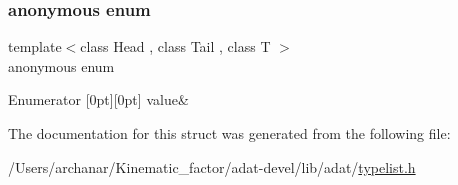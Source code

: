 \subsubsection{\texorpdfstring{anonymous enum}{anonymous enum}}
{\footnotesize\ttfamily template$<$class Head , class Tail , class T $>$ \\
anonymous enum}

\begin{DoxyEnumFields}{Enumerator}
[0pt][0pt]{}\mbox{\label{structUtil_1_1TL_1_1IndexOf_3_01Typelist_3_01Head_00_01Tail_01_4_00_01T_01_4_a892f6adeff170978902bc573ce2ed8c6a1e7a87771ff8eabd5b26f13ca2c1852b}} 
value&\\
\hline

\end{DoxyEnumFields}


The documentation for this struct was generated from the following file\+:\begin{DoxyCompactItemize}
\item 
/\+Users/archanar/\+Kinematic\+\_\+factor/adat-\/devel/lib/adat/\mbox{\hyperlink{adat-devel_2lib_2adat_2typelist_8h}{typelist.\+h}}\end{DoxyCompactItemize}
